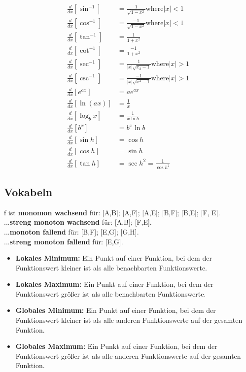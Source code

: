 \documentclass{book}
\begin{document}
\begin{align*}
    \frac{d}{dx}\left[\sin^{-1}\right]&= \frac{1}{\sqrt{1-x^2}} \text{where} |x|<1\\
    \frac{d}{dx}\left[\cos^{-1}\right]&= \frac{-1}{\sqrt{1-x^2}} \text{where} |x|<1 \\
    \frac{d}{dx}\left[\tan^{-1}\right]&=\frac{1}{1+x^2}  \\
    \frac{d}{dx}\left[\cot^{-1}\right]&= \frac{-1}{1+x^2} \\
    \frac{d}{dx}\left[\sec^{-1}\right]&=\frac{1}{|x|\sqrt{x_2-1}} \text{where} |x|>1\\
    \frac{d}{dx}\left[\csc^{-1}\right]&= \frac{-1}{|x|\sqrt{x^2-1}} \text{where} |x|>1 \\
    \frac{d}{dx}\left[e^{ax}\right]&= ae^{ax} \\
    \frac{d}{dx}\left[\ln(ax)\right]&= \frac{1}{x} \\
    \frac{d}{dx}\left[\log_bx\right]&= \frac{1}{x \ln b} \\
    \frac{d}{dx}\left[b^x\right]&= b^x \ln b \\
    \frac{d}{dx}\left[\sin h\right]&= \cos h \\
    \frac{d}{dx}\left[\cos h\right]&= \sin h \\
    \frac{d}{dx}\left[\tan h\right]&= \sec h^2= \frac{1}{\cos h^{2}}
\end{align*}

\subsection{Vokabeln}

f ist \textbf{monomon wachsend} für: [A,B]; [A,F]; [A,E]; [B,F]; [B,E]; [F, E].\\ 
...\textbf{streng monoton wachsend} für: [A,B]; [F,E].\\  
...\textbf{monoton fallend} für: [B,F]; [E,G]; [G,H].\\
...\textbf{streng monoton fallend} für: [E,G].

\begin{itemize}
\item \textbf{Lokales Minimum:} Ein Punkt auf einer Funktion, bei dem der Funktionswert kleiner ist als alle benachbarten Funktionswerte.
\item \textbf{Lokales Maximum:} Ein Punkt auf einer Funktion, bei dem der Funktionswert größer ist als alle benachbarten Funktionswerte.
\item \textbf{Globales Minimum:} Ein Punkt auf einer Funktion, bei dem der Funktionswert kleiner ist als alle anderen Funktionswerte auf der gesamten Funktion.
\item \textbf{Globales Maximum:} Ein Punkt auf einer Funktion, bei dem der Funktionswert größer ist als alle anderen Funktionswerte auf der gesamten Funktion.
\end{itemize}
\end{document}
